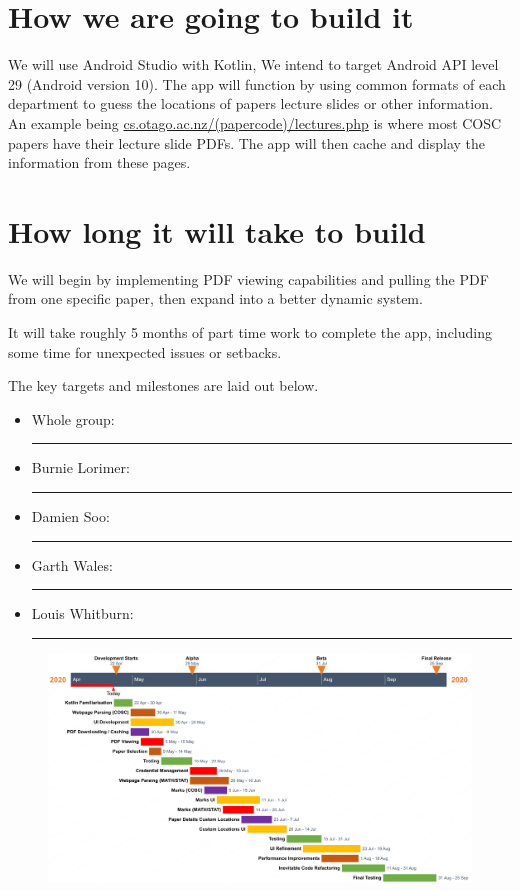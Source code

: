 \documentclass{article}
\begin{document}
	\section{How we are going to build it}

	We will use Android Studio with Kotlin, We intend to target Android API level 29 (Android version 10). The app will function by using common formats of each department to guess the locations of papers lecture slides or other information. An example being \url{cs.otago.ac.nz/(papercode)/lectures.php} is where most COSC papers have their lecture slide PDFs. The app will then cache and display the information from these pages.

	\section{How long it will take to build}

	We will begin by implementing PDF viewing capabilities and pulling the PDF from one specific paper, then expand into a better dynamic system. 

	It will take roughly 5 months of part time work to complete the app, including some time for unexpected issues or setbacks.
	
	The key targets and milestones are laid out below.
	
	\begin{itemize}
		\item Whole group: {\color{ag} \rule{\baselineskip}{\baselineskip}}
		\item Burnie Lorimer: {\color{bl} \rule{\baselineskip}{\baselineskip}}
		\item Damien Soo: {\color{ds} \rule{\baselineskip}{\baselineskip}}
		\item Garth Wales: {\color{gw} \rule{\baselineskip}{\baselineskip}}
		\item Louis Whitburn: {\color{lw} \rule{\baselineskip}{\baselineskip}}
	\end{itemize}
	
	\begin{figure}[H]
		\centering
		\includegraphics[width=\linewidth]{chart.png}
	\end{figure}
	
\end{document}
